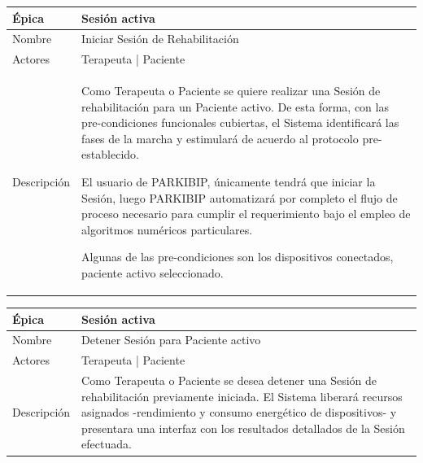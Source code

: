 \begin{table}[H] 
\centering
\begin{tabular}{| p{2cm} | p{10cm} |}
\hline
Épica & Sesión activa\\ \hline
Nombre & Iniciar Sesión de Rehabilitación\\ \hline
Actores & Terapeuta | Paciente \\ \hline
Descripción & Como Terapeuta o Paciente se quiere realizar una Sesión de rehabilitación para un Paciente activo. De esta forma, con las pre-condiciones funcionales cubiertas, el Sistema identificará las fases de la marcha y estimulará de acuerdo al protocolo pre-establecido. 

El usuario de PARKIBIP, únicamente tendrá que iniciar la Sesión, luego PARKIBIP automatizará por completo el flujo de proceso necesario para cumplir el requerimiento bajo el empleo de algoritmos numéricos particulares.

Algunas de las pre-condiciones son los dispositivos conectados, paciente activo seleccionado.\\ \hline
\end{tabular}
\end{table}

\begin{table}[H] 
\centering
\begin{tabular}{| p{2cm} | p{10cm} |}
\hline
Épica & Sesión activa\\ \hline
Nombre & Detener Sesión para Paciente activo\\ \hline
Actores & Terapeuta | Paciente\\ \hline
Descripción & Como Terapeuta o Paciente  se desea detener una Sesión de rehabilitación previamente iniciada. El Sistema liberará recursos asignados -rendimiento y consumo energético de dispositivos- y presentara una interfaz con los resultados detallados de la Sesión efectuada.\\ \hline
\end{tabular}
\end{table}

